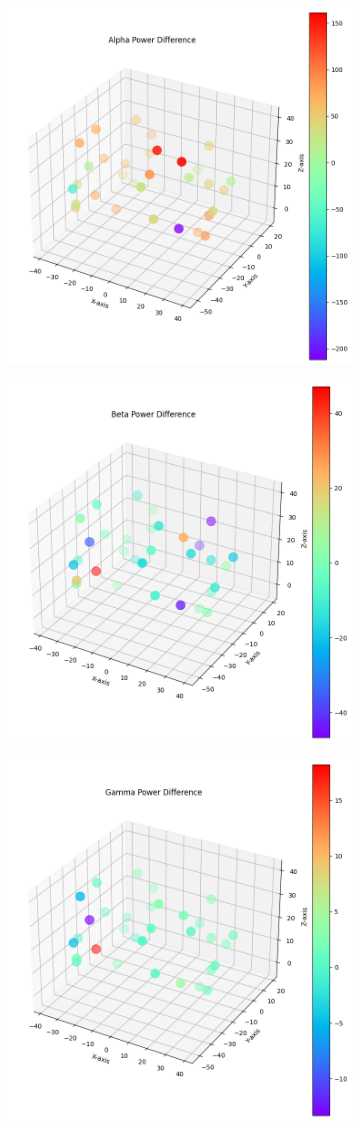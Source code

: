 \documentclass[format=sigconf, nonacm=true, review=false, screen=true]{acmart}
\begin{document}
\begin{figure}[H]
     \centering
     \begin{subfigure}
         \centering
         \includegraphics[width=0.48\columnwidth]{figures/cluster-alpha.png}
     \end{subfigure}
     \begin{subfigure}
         \centering
         \includegraphics[width=0.48\columnwidth]{figures/cluster-beta.png}
     \end{subfigure}
     \begin{subfigure}
         \centering
         \includegraphics[width=0.48\columnwidth]{figures/cluster-gamma.png}

\end{subfigure}
\end{figure}
\end{document}
